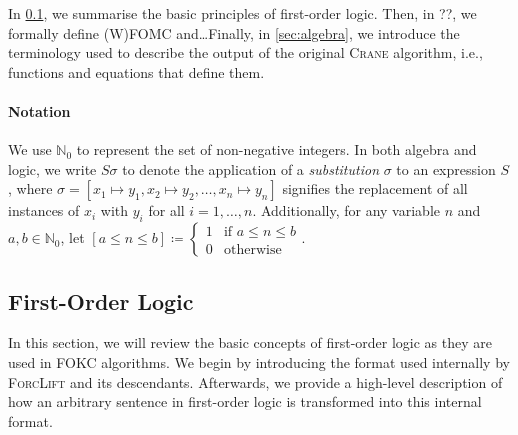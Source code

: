 \documentclass[a4paper,UKenglish,cleveref, autoref, thm-restate]{lipics-v2021}
\begin{document}

In \cref{sec:logic}, we summarise the basic principles of first-order logic.
Then, in ??, we formally define (W)FOMC and\ldots Finally, in
\cref{sec:algebra}, we introduce the terminology used to describe the output of
the original \textsc{Crane} algorithm, i.e., functions and equations that define
them.

\paragraph*{Notation}
We use $\mathbb{N}_{0}$ to represent the set of non-negative integers. In both
algebra and logic, we write $S\sigma$ to denote the application of a
\emph{substitution} $\sigma$ to an expression $S$, where
$\sigma = [x_{1} \mapsto y_{1}, x_{2} \mapsto y_{2}, \dots, x_{n} \mapsto y_{n}]$
signifies the replacement of all instances of $x_{i}$ with $y_{i}$ for all
$i = 1, \dots, n$. Additionally, for any variable $n$ and
$a, b \in \mathbb{N}_{0}$, let $[a \le n \le b] \coloneqq \begin{cases}
  1 & \text{if $a \le n \le b$} \\
  0 & \text{otherwise}
\end{cases}$.

\subsection{First-Order Logic}\label{sec:logic}

In this section, we will review the basic concepts of first-order logic as they
are used in FOKC algorithms. We begin by introducing the format used internally
by \textsc{ForcLift} and its descendants. Afterwards, we provide a high-level
description of how an arbitrary sentence in first-order logic is transformed
into this internal format.
\end{document}

